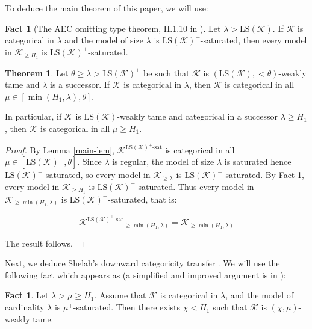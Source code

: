 \documentclass[12pt]{amsart}
\theoremstyle{definition}
\newtheorem{thm}[mydef]{Theorem}
\newtheorem{fact}[mydef]{Fact}
\begin{document}
To deduce the main theorem of this paper, we will use:

\begin{fact}[The AEC omitting type theorem, II.1.10 in \cite{sh394}]\label{omitting-type}
  Let $\lambda > {\text{LS}} ({\mathcal{K}})$. If ${\mathcal{K}}$ is categorical in $\lambda$ and the model of size $\lambda$ is ${\text{LS}} ({\mathcal{K}})^+$-saturated, then every model in ${\mathcal{K}}_{\ge H_1}$ is ${\text{LS}} ({\mathcal{K}})^+$-saturated.
\end{fact}

\begin{thm}\label{main-thm}
  Let $\theta \ge \lambda > {\text{LS}} ({\mathcal{K}})^+$ be such that ${\mathcal{K}}$ is $({\text{LS}} ({\mathcal{K}}), <\theta)$-weakly tame and $\lambda$ is a successor. If ${\mathcal{K}}$ is categorical in $\lambda$, then ${\mathcal{K}}$ is categorical in all $\mu \in [\min (H_1, \lambda), \theta]$.

  In particular, if ${\mathcal{K}}$ is ${\text{LS}} ({\mathcal{K}})$-weakly tame and categorical in a successor $\lambda \ge H_1$, then ${\mathcal{K}}$ is categorical in all $\mu \ge H_1$.
\end{thm}
\begin{proof}
  By Lemma \ref{main-lem}, ${{{{\mathcal{K}}}^{{{{\text{LS}} ({\mathcal{K}})^+}}\text{-sat}}}}$ is categorical in all $\mu \in [{\text{LS}} ({\mathcal{K}})^+, \theta]$. Since $\lambda$ is regular, the model of size $\lambda$ is saturated hence ${\text{LS}} ({\mathcal{K}})^+$-saturated, so every model in ${\mathcal{K}}_{\ge \lambda}$ is ${\text{LS}} ({\mathcal{K}})^+$-saturated. By Fact \ref{omitting-type}, every model in ${\mathcal{K}}_{\ge H_1}$ is ${\text{LS}} ({\mathcal{K}})^+$-saturated. Thus every model in ${\mathcal{K}}_{\ge \min (H_1, \lambda)}$ is ${\text{LS}} ({\mathcal{K}})^+$-saturated, that is:

  $$
  {{{{\mathcal{K}}}^{{{{\text{LS}} ({\mathcal{K}})^+}}\text{-sat}}}}_{\ge \min (H_1, \lambda)} = {\mathcal{K}}_{\ge \min (H_1, \lambda)}
  $$

  The result follows.
\end{proof}

Next, we deduce Shelah's downward categoricity transfer \cite{sh394}. We will use the following fact which appears as \cite[Main Claim II.2.3]{sh394} (a simplified and improved argument is in \cite[Theorem 11.15]{baldwinbook09}):

\begin{fact}\label{weak-tameness-from-categ-fact}
  Let $\lambda > \mu \ge H_1$. Assume that ${\mathcal{K}}$ is categorical in $\lambda$, and the model of cardinality $\lambda$ is $\mu^+$-saturated. Then there exists $\chi < H_1$ such that ${\mathcal{K}}$ is $(\chi, \mu)$-weakly tame.
\end{fact}
\end{document}
